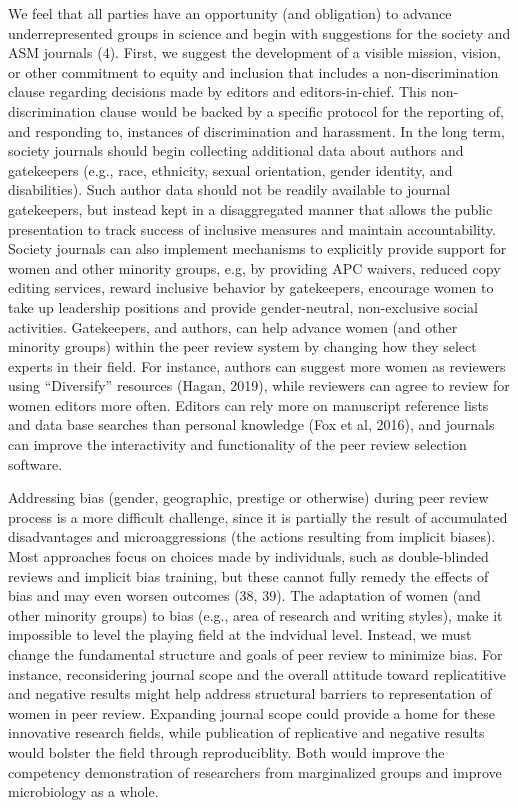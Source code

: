 \documentclass[11pt,]{article}
\begin{document}
We feel that all parties have an opportunity (and obligation) to advance
underrepresented groups in science and begin with suggestions for the
society and ASM journals (4). First, we suggest the development of a
visible mission, vision, or other commitment to equity and inclusion
that includes a non-discrimination clause regarding decisions made by
editors and editors-in-chief. This non-discrimination clause would be
backed by a specific protocol for the reporting of, and responding to,
instances of discrimination and harassment. In the long term, society
journals should begin collecting additional data about authors and
gatekeepers (e.g., race, ethnicity, sexual orientation, gender identity,
and disabilities). Such author data should not be readily available to
journal gatekeepers, but instead kept in a disaggregated manner that
allows the public presentation to track success of inclusive measures
and maintain accountability. Society journals can also implement
mechanisms to explicitly provide support for women and other minority
groups, e.g, by providing APC waivers, reduced copy editing services,
reward inclusive behavior by gatekeepers, encourage women to take up
leadership positions and provide gender-neutral, non-exclusive social
activities. Gatekeepers, and authors, can help advance women (and other
minority groups) within the peer review system by changing how they
select experts in their field. For instance, authors can suggest more
women as reviewers using ``Diversify'' resources (Hagan, 2019), while
reviewers can agree to review for women editors more often. Editors can
rely more on manuscript reference lists and data base searches than
personal knowledge (Fox et al, 2016), and journals can improve the
interactivity and functionality of the peer review selection software.

Addressing bias (gender, geographic, prestige or otherwise) during peer
review process is a more difficult challenge, since it is partially the
result of accumulated disadvantages and microaggressions (the actions
resulting from implicit biases). Most approaches focus on choices made
by individuals, such as double-blinded reviews and implicit bias
training, but these cannot fully remedy the effects of bias and may even
worsen outcomes (38, 39). The adaptation of women (and other minority
groups) to bias (e.g., area of research and writing styles), make it
impossible to level the playing field at the indvidual level. Instead,
we must change the fundamental structure and goals of peer review to
minimize bias. For instance, reconsidering journal scope and the overall
attitude toward replicatitive and negative results might help address
structural barriers to representation of women in peer review. Expanding
journal scope could provide a home for these innovative research fields,
while publication of replicative and negative results would bolster the
field through reproduciblity. Both would improve the competency
demonstration of researchers from marginalized groups and improve
microbiology as a whole.
\end{document}
